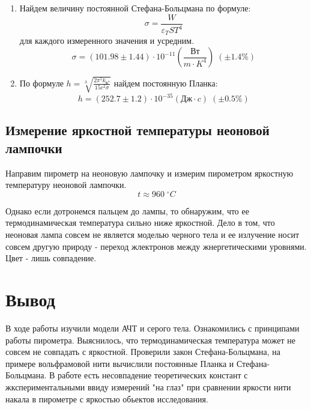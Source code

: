 \documentclass[a4paper]{article}
\begin{document}
\begin{enumerate}
    \item Найдем величину постоянной Стефана-Больцмана по формуле:
    $$\sigma = \frac{W}{\varepsilon_T S T^4}$$
    для каждого измеренного значения и усредним.
    $$\sigma = (101.98 \pm 1.44 )\cdot 10^{-11} \left ( \frac{\text{Вт}}{m \cdot K^4} \right ) \; (\pm 1.4\%)$$

    \item По формуле $h = \sqrt[3]{\frac{2 \pi^5 k_{\text{Б}^4}}{15 c^2 \sigma}}$ найдем постоянную Планка:
    $$h = (252.7 \pm 1.2) \cdot 10^{-35} (\text{Дж} \cdot c) \; (\pm 0.5 \%)$$

\end{enumerate}


\subsection{Измерение яркостной температуры неоновой лампочки}

Направим пирометр на неоновую лампочку и измерим пирометром яркостную температуру неоновой лампочки.
$$t \approx 960 \; ^{\circ}C$$

Однако если дотронемся пальцем до лампы, то обнаружим, что ее термодинамическая температура сильно ниже яркостной.
Дело в том, что неоновая лампа совсем не является моделью черного тела и ее излучение носит совсем другую природу - 
переход жлектронов между жнергетическими уровнями. Цвет - лишь совпадение.



\section{Вывод}

В ходе работы изучили модели АЧТ и серого тела. Ознакомились с принципами работы пирометра. Выяснилось, что термодинамическая
температура может не совсем не совпадать с яркостной. Проверили закон Стефана-Больцмана, на примере вольфрамовой нити вычислили
постоянные Планка и Стефана-Больцмана. В работе есть несовпадение теоретических констант с жкспериментальными ввиду измерений "на глаз"
при сравнении яркости нити накала в пирометре с яркостью обьектов исследования.
\end{document}
